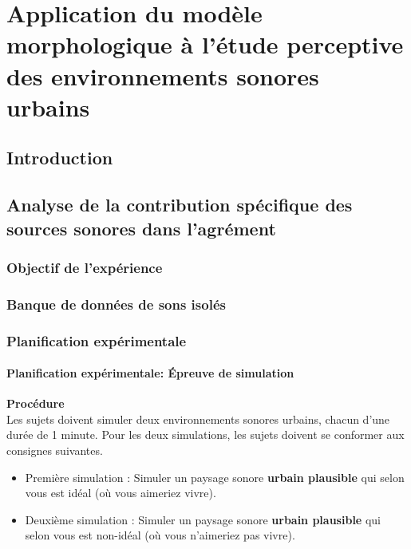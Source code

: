\chapter{Application du modèle morphologique à l’étude perceptive des environnements sonores urbains}\label{ch:psycho_xp}

\section{Introduction}

\section{Analyse de la contribution spécifique des sources sonores dans l'agrément}

\subsection{Objectif de l'expérience}

\subsection{Banque de données de sons isolés}

\subsection{Planification expérimentale}

\subsubsection{Planification expérimentale: Épreuve de simulation}

\textbf{Procédure} \\

Les sujets doivent simuler deux environnements sonores urbains, chacun d'une durée de 1 minute.  Pour les deux simulations, les sujets doivent se conformer aux consignes suivantes.

\begin{itemize}
\item Première simulation : Simuler un paysage sonore \textbf{urbain plausible} qui selon vous est idéal (où vous aimeriez vivre).
\item Deuxième simulation : Simuler un paysage sonore \textbf{urbain plausible} qui selon vous est non-idéal (où vous n'aimeriez pas vivre).
\end{itemize}

